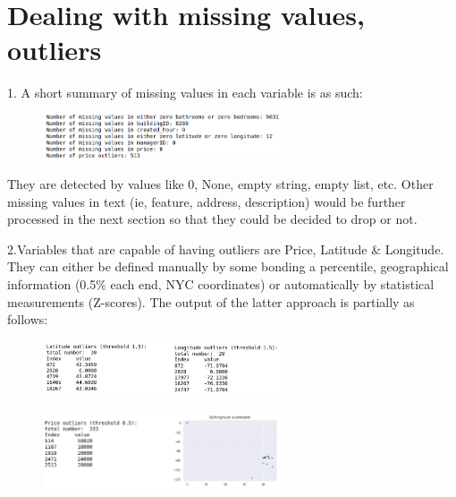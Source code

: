 \documentclass[12pt,twocolumn,letterpaper]{article}
\begin{document}






\section{Dealing with missing values, outliers}

1. A short summary of missing values in each variable is as such:


\begin{figure}[h!]
    \centering
    \includegraphics[width=7cm]{CMPT459_9.png}
    \caption{}
    \label{fig:galaxy}
\end{figure}

They are detected by values like 0, None, empty string, empty list, etc. Other missing values in text (ie, feature, address, description) would be further processed in the next section so that they could be decided to drop or not.

\-

2.Variables that are capable of having outliers are Price, Latitude & Longitude. They can either be defined manually by some bonding a percentile, geographical information (0.5\% each end, NYC coordinates) or automatically by statistical measurements (Z-scores). The output of the latter approach is partially as follows: 


\begin{figure}[h!]
    \centering
    \includegraphics[width=7cm]{CMPT459_pair3.png}
    \caption{}
    \label{fig:galaxy}
\end{figure}


\begin{figure}[h!]
    \centering
    \includegraphics[width=7cm]{CMPT459_pair4.png}
    \caption{}
    \label{fig:galaxy}
\end{figure}
\end{document}
